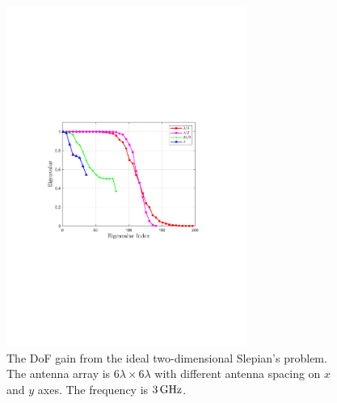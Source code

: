 \documentclass[12pt,draftclsnofoot,journal,onecolumn]{IEEEtran}
\begin{document}
		 \begin{figure}
		 	\centering 
		 	\includegraphics[width=0.7\textwidth]{figs/eigen_two_dimensional.pdf} 
		 	\caption{The DoF gain from the ideal two-dimensional Slepian's problem. The antenna array is $6\lambda \times 6\lambda$ with different antenna spacing on $x$ and $y$ axes. The frequency is $3\,{\rm GHz}$.} 
		 	\label{different_z_setting_2d}
		 \end{figure}
		 
\end{document}
